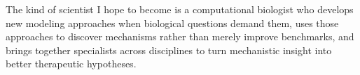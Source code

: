 \documentclass[11pt]{article}
\begin{document}
The kind of scientist I hope to become is a computational biologist who develops new modeling approaches when biological questions demand them, uses those approaches to discover mechanisms rather than merely improve benchmarks, and brings together specialists across disciplines to turn mechanistic insight into better therapeutic hypotheses.

\begingroup
\footnotesize
\renewcommand{\bibsection}{\section*{\footnotesize References}}


\endgroup
\end{document}
